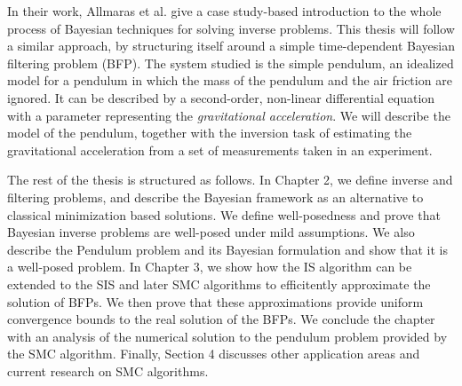 In their work, Allmaras et al. \cite{bayes-tutorial} give a case study-based introduction to the whole process of Bayesian techniques for solving inverse problems. This thesis will follow a similar approach, by structuring itself around a simple time-dependent Bayesian filtering problem (BFP). The system studied is the simple pendulum, an idealized model for a pendulum in which the mass of the pendulum and the air friction are ignored. It can be described by a second-order, non-linear differential equation with a parameter representing the \textit{gravitational acceleration}. We will describe the model of the pendulum, together with the inversion task of estimating the gravitational acceleration from a set of measurements taken in an experiment. 

The rest of the thesis is structured as follows. In Chapter 2, we define inverse and filtering problems, and describe the Bayesian framework as an alternative to classical minimization based solutions. We define well-posedness and prove that Bayesian inverse problems are well-posed under mild assumptions. We also describe the Pendulum problem and its Bayesian formulation and show that it is a well-posed problem. In Chapter 3, we show how the IS algorithm can be extended to the SIS and later SMC algorithms to efficitently approximate the solution of BFPs. We then prove that these approximations provide uniform convergence bounds to the real solution of the BFPs. We conclude the chapter with an analysis of the numerical solution to the pendulum problem provided by the SMC algorithm. Finally, Section 4 discusses other application areas and current research on SMC algorithms.

